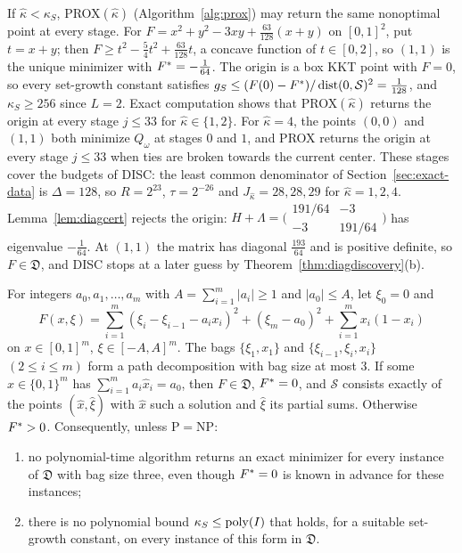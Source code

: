 \begin{remark}\label{rem:falseguess}
If $\hat\kappa<\kappa_S$, PROX$(\hat\kappa)$ (Algorithm~\ref{alg:prox}) may
return the same nonoptimal point at every stage. For
$F=x^2+y^2-3xy+\frac{63}{128}(x+y)$ on $[0,1]^2$, put $t=x+y$; then $F\ge t^2-\frac54t^2+\frac{63}{128}t$, a concave function of
$t\in[0,2]$, so $(1,1)$ is the unique minimizer with $F^{*}=-\frac1{64}$. The
origin is a box KKT point with $F=0$, so every set-growth constant
satisfies $g_S\le(F(0)-F^{*})/\operatorname{dist}(0,\mathcal S)^2=\frac1{128}$, and
$\kappa_S\ge256$ since $L=2$. Exact computation shows that
PROX$(\hat\kappa)$ returns the origin at every stage $j\le33$ for
$\hat\kappa\in\{1,2\}$. For
$\hat\kappa=4$, the points $(0,0)$ and $(1,1)$ both minimize $Q_\omega$ at
stages $0$ and $1$, and PROX returns the origin at every stage $j\le33$ when
ties are broken towards the current center. These stages cover the budgets
of DISC: the least common denominator of Section~\ref{sec:exact-data} is
$\Delta=128$, so $R=2^{23}$, $\tau=2^{-26}$ and $J_{\hat\kappa}=28,28,29$ for
$\hat\kappa=1,2,4$. Lemma~\ref{lem:diagcert} rejects the origin:
$H+\Lambda=\bigl(\begin{smallmatrix}191/64&-3\\-3&191/64\end{smallmatrix}\bigr)$
has eigenvalue $-\frac1{64}$. At $(1,1)$ the matrix has diagonal
$\frac{193}{64}$ and is positive definite, so $F\in\mathfrak D$, and DISC
stops at a later guess by Theorem~\ref{thm:diagdiscovery}(b).
\end{remark}

\begin{proposition}\label{prop:sshard}
For integers $a_0,a_1,\ldots,a_m$ with $A=\sum_{i=1}^m|a_i|\ge1$ and
$|a_0|\le A$, let $\xi_0=0$ and
\[
F(x,\xi)=\sum_{i=1}^m(\xi_i-\xi_{i-1}-a_ix_i)^2+(\xi_m-a_0)^2
+\sum_{i=1}^mx_i(1-x_i)
\]
on $x\in[0,1]^m$, $\xi\in[-A,A]^m$. The bags $\{\xi_1,x_1\}$ and
$\{\xi_{i-1},\xi_i,x_i\}$ $(2\le i\le m)$ form a path decomposition with bag
size at most $3$. If some $\hat x\in\{0,1\}^m$ has
$\sum_{i=1}^ma_i\hat x_i=a_0$, then $F\in\mathfrak D$, $F^{*}=0$, and
$\mathcal S$ consists exactly of the points $(\hat x,\hat\xi)$ with $\hat x$
such a solution and $\hat\xi$ its partial sums. Otherwise $F^{*}>0$.
Consequently, unless $\mathrm P=\mathrm{NP}$:
\begin{enumerate}[label=(\roman*)]
\item no polynomial-time algorithm returns an exact minimizer for every
instance of $\mathfrak D$ with bag size three, even though $F^{*}=0$ is known
in advance for these instances;
\item there is no polynomial bound $\kappa_S\le\operatorname{poly}(I)$ that holds, for a
suitable set-growth constant, on every instance of this form in
$\mathfrak D$.
\end{enumerate}
\end{proposition}

